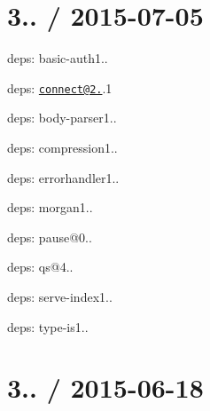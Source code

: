 {\ttfamily \section*{3.. / 2015-\/07-\/05 }}

{\ttfamily }

{\ttfamily 
\begin{DoxyItemize}
\item deps\+: basic-\/auth1..
\item deps\+: \href{mailto:connect@2.30}{\tt connect@2.}.1
\begin{DoxyItemize}
\item deps\+: body-\/parser1..
\item deps\+: compression1..
\item deps\+: errorhandler1..
\item deps\+: morgan1..
\item deps\+: pause@0..
\item deps\+: qs@4..
\item deps\+: serve-\/index1..
\item deps\+: type-\/is1..
\end{DoxyItemize}
\end{DoxyItemize}}

{\ttfamily \section*{3.. / 2015-\/06-\/18 }}

{\ttfamily }

